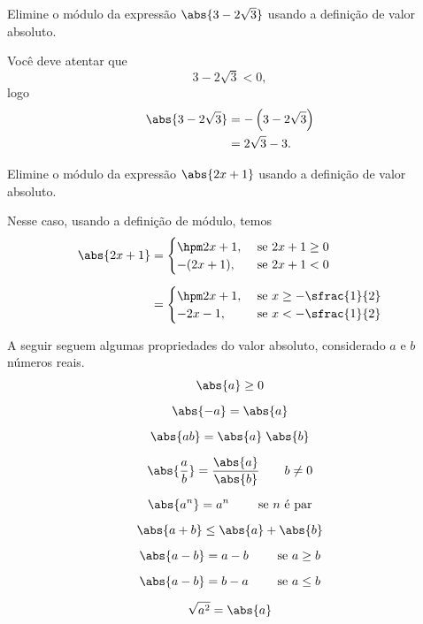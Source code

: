 \begin{example}
  Elimine o módulo da expressão
  \(
    \abs{3-2\sqrt{3}}
  \)
  usando a definição de valor absoluto.

  \solution
  Você deve atentar que
  \[
    3-2\sqrt{3}<0,
  \]
  logo
  \begin{align*}
   \abs{3-2\sqrt{3}}
   & = -\left( 3 - 2\sqrt{3} \right) \\
   & =  2\sqrt{3}-3.
  \end{align*}
\end{example}

\begin{example}
  Elimine o módulo da expressão
  \(
    \abs{2x+1}
  \)
  usando a definição de valor absoluto.

  \solution
  Nesse caso, usando a definição de módulo, temos
  \begin{align*}
    \abs{2x+1}
    & = \begin{cases}
          \hpm 2x+1,  & \text{ se } 2x + 1 \geq 0 \\
          -   (2x+1), & \text{ se } 2x + 1 <    0
        \end{cases}
    \\[2mm]
    & = \begin{cases}
        \hpm 2x+1, & \text{ se } x \geq -\sfrac{1}{2} \\
        -    2x-1, & \text{ se } x <    -\sfrac{1}{2}
        \end{cases}
  \end{align*}
\end{example}

A seguir seguem algumas propriedades do valor absoluto,
considerado $a$ e $b$ números reais.
\begin{gather}
  \abs{a} \geq 0                 \\[2mm]
  \abs{-a} = \abs{a}             \\[2mm]
  \abs{ab} = \abs{a} \; \abs{b}  \\[2mm]
  \abs{\frac{a}{b}} = \frac{\abs{a}}{\abs{b}} \qquad b \neq 0  \\[2mm]
  \abs{a^n} = a^n \qquad \text{ se } n \text{ é par}           \\[2mm]
  \abs{a+b} \leq \abs{a} + \abs{b}            \\[2mm]
  \abs{a-b} = a-b \qquad \text{ se } a \geq b \\[2mm]
  \abs{a-b} = b-a \qquad \text{ se } a \leq b \\[2mm]
  \sqrt{a^2} = \abs{a}
\end{gather}

